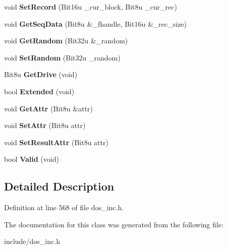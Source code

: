 \begin{DoxyCompactItemize}
\item 
\hypertarget{classDOS__FCB_aa4f8785c2b5e67e613e38a2663cc08b2}{void {\bfseries Set\-Record} (Bit16u \-\_\-cur\-\_\-block, Bit8u \-\_\-cur\-\_\-rec)}\label{classDOS__FCB_aa4f8785c2b5e67e613e38a2663cc08b2}

\item 
\hypertarget{classDOS__FCB_a2e9b07c8a0a281e21f6151e4766cd741}{void {\bfseries Get\-Seq\-Data} (Bit8u \&\-\_\-fhandle, Bit16u \&\-\_\-rec\-\_\-size)}\label{classDOS__FCB_a2e9b07c8a0a281e21f6151e4766cd741}

\item 
\hypertarget{classDOS__FCB_ab49248721f42da4974744a8810027230}{void {\bfseries Get\-Random} (Bit32u \&\-\_\-random)}\label{classDOS__FCB_ab49248721f42da4974744a8810027230}

\item 
\hypertarget{classDOS__FCB_aa6d6128bfcca69f73790e0e07be677da}{void {\bfseries Set\-Random} (Bit32u \-\_\-random)}\label{classDOS__FCB_aa6d6128bfcca69f73790e0e07be677da}

\item 
\hypertarget{classDOS__FCB_a6da07c697a956f04f9df2fa0cb9249ab}{Bit8u {\bfseries Get\-Drive} (void)}\label{classDOS__FCB_a6da07c697a956f04f9df2fa0cb9249ab}

\item 
\hypertarget{classDOS__FCB_ad4a466929e2135cbbf36cce3f93c1009}{bool {\bfseries Extended} (void)}\label{classDOS__FCB_ad4a466929e2135cbbf36cce3f93c1009}

\item 
\hypertarget{classDOS__FCB_aead0618722ff1f674547679cd38451ad}{void {\bfseries Get\-Attr} (Bit8u \&attr)}\label{classDOS__FCB_aead0618722ff1f674547679cd38451ad}

\item 
\hypertarget{classDOS__FCB_ac0a82ec6f3d72a69d54579fa640c5669}{void {\bfseries Set\-Attr} (Bit8u attr)}\label{classDOS__FCB_ac0a82ec6f3d72a69d54579fa640c5669}

\item 
\hypertarget{classDOS__FCB_a75db597566f524cb0de9dfc2be6a8c7f}{void {\bfseries Set\-Result\-Attr} (Bit8u attr)}\label{classDOS__FCB_a75db597566f524cb0de9dfc2be6a8c7f}

\item 
\hypertarget{classDOS__FCB_ab247afb9301a93fb192cd8d60acf6219}{bool {\bfseries Valid} (void)}\label{classDOS__FCB_ab247afb9301a93fb192cd8d60acf6219}

\end{DoxyCompactItemize}


\subsection{Detailed Description}


Definition at line 568 of file dos\-\_\-inc.\-h.



The documentation for this class was generated from the following file\-:\begin{DoxyCompactItemize}
\item 
include/dos\-\_\-inc.\-h\end{DoxyCompactItemize}
